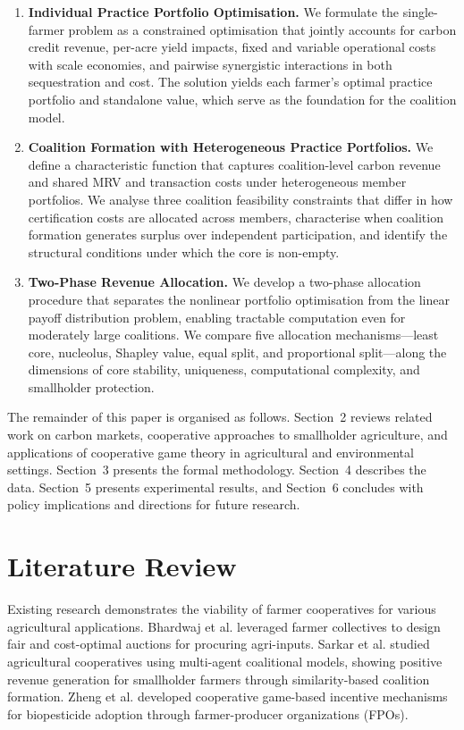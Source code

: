 \documentclass[manuscript, screen, review, anonymous]{acmart}
\begin{document}
\begin{enumerate}
    \item \textbf{Individual Practice Portfolio Optimisation.} We formulate the single-farmer problem as a constrained optimisation that jointly accounts for carbon credit revenue, per-acre yield impacts, fixed and variable operational costs with scale economies, and pairwise synergistic interactions in both sequestration and cost. The solution yields each farmer's optimal practice portfolio and standalone value, which serve as the foundation for the coalition model.

    \item \textbf{Coalition Formation with Heterogeneous Practice Portfolios.} We define a characteristic function that captures coalition-level carbon revenue and shared MRV and transaction costs under heterogeneous member portfolios. We analyse three coalition feasibility constraints that differ in how certification costs are allocated across members, characterise when coalition formation generates surplus over independent participation, and identify the structural conditions under which the core is non-empty.

    \item \textbf{Two-Phase Revenue Allocation.} We develop a two-phase allocation procedure that separates the nonlinear portfolio optimisation from the linear payoff distribution problem, enabling tractable computation even for moderately large coalitions. We compare five allocation mechanisms---least core, nucleolus, Shapley value, equal split, and proportional split---along the dimensions of core stability, uniqueness, computational complexity, and smallholder protection.
\end{enumerate}

The remainder of this paper is organised as follows. Section~2 reviews related work on carbon markets, cooperative approaches to smallholder agriculture, and applications of cooperative game theory in agricultural and environmental settings. Section~3 presents the formal methodology. Section~4 describes the data. Section~5 presents experimental results, and Section~6 concludes with policy implications and directions for future research.

\section{Literature Review}
Existing research demonstrates the viability of farmer cooperatives for various agricultural applications. Bhardwaj et al. \cite{bhardwaj2023designing} leveraged farmer collectives to design fair and cost-optimal auctions for procuring agri-inputs. Sarkar et al. \cite{sarkar2023coalition} studied agricultural cooperatives using multi-agent coalitional models, showing positive revenue generation for smallholder farmers through similarity-based coalition formation. Zheng et al. \cite{zheng2022cooperative} developed cooperative game-based incentive mechanisms for biopesticide adoption through farmer-producer organizations (FPOs).
\end{document}
